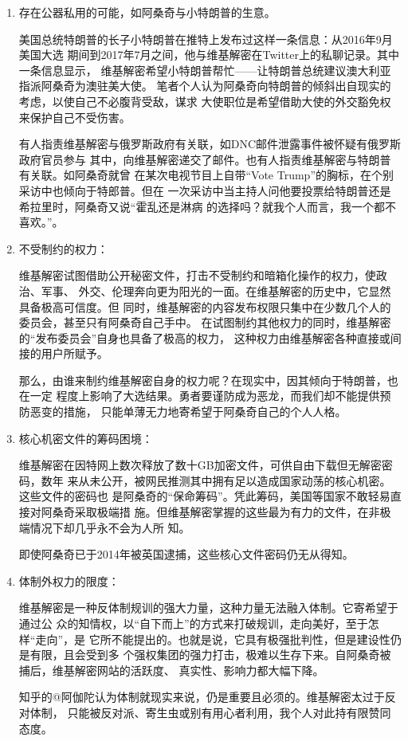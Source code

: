 \begin{enumerate}
\item 存在公器私用的可能，如阿桑奇与小特朗普的生意。

  美国总统特朗普的长子小特朗普在推特上发布过这样一条信息：从2016年9月美国大选
  期间到2017年7月之间，他与维基解密在Twitter上的私聊记录。其中一条信息显示，
  维基解密希望小特朗普帮忙——让特朗普总统建议澳大利亚指派阿桑奇为澳驻美大使。
  笔者个人认为阿桑奇向特朗普的倾斜出自现实的考虑，以使自己不必腹背受敌，谋求
  大使职位是希望借助大使的外交豁免权来保护自己不受伤害。

  有人指责维基解密与俄罗斯政府有关联，如DNC邮件泄露事件被怀疑有俄罗斯政府官员参与
  其中，向维基解密递交了邮件。也有人指责维基解密与特朗普有关联。如阿桑奇就曾
  在某次电视节目上自带“Vote Trump”的胸标，在个别采访中也倾向于特郎普。但在
  一次采访中当主持人问他要投票给特朗普还是希拉里时，阿桑奇又说“霍乱还是淋病
  的选择吗？就我个人而言，我一个都不喜欢。”。

\item 不受制约的权力：

  维基解密试图借助公开秘密文件，打击不受制约和暗箱化操作的权力，使政治、军事、
  外交、伦理奔向更为阳光的一面。在维基解密的历史中，它显然具备极高可信度。但
  同时，维基解密的内容发布权限只集中在少数几个人的委员会，甚至只有阿桑奇自己手中。
  在试图制约其他权力的同时，维基解密的“发布委员会”自身也具备了极高的权力，
  这种权力由维基解密各种直接或间接的用户所赋予。

  那么，由谁来制约维基解密自身的权力呢？在现实中，因其倾向于特朗普，也在一定
  程度上影响了大选结果。勇者要谨防成为恶龙，而我们却不能提供预防恶变的措施，
  只能单薄无力地寄希望于阿桑奇自己的个人人格。


\item 核心机密文件的筹码困境：

  维基解密在因特网上数次释放了数十GB加密文件，可供自由下载但无解密密码，数年
  来从未公开，被网民推测其中拥有足以造成国家动荡的核心机密。这些文件的密码也
  是阿桑奇的“保命筹码”。凭此筹码，美国等国家不敢轻易直接对阿桑奇采取极端措
  施。但维基解密掌握的这些最为有力的文件，在非极端情况下却几乎永不会为人所
  知。

  即使阿桑奇已于2014年被英国逮捕，这些核心文件密码仍无从得知。

\item 体制外权力的限度：

  维基解密是一种反体制规训的强大力量，这种力量无法融入体制。它寄希望于通过公
  众的知情权，以“自下而上”的方式来打破规训，走向美好，至于怎样“走向”，是
  它所不能提出的。也就是说，它具有极强批判性，但是建设性仍是有限，且会受到多
  个强权集团的强力打击，极难以生存下来。自阿桑奇被捕后，维基解密网站的活跃度、
  真实性、影响力都大幅下降。

  知乎的@阿伽陀认为体制就现实来说，仍是重要且必须的。维基解密太过于反对体制，
  只能被反对派、寄生虫或别有用心者利用，我个人对此持有限赞同态度。
\end{enumerate}


